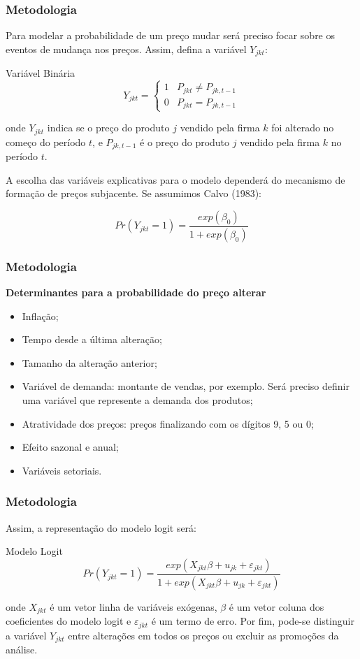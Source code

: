 \documentclass[aspectratio=169]{beamer}
\begin{document}
\begin{frame}\frametitle{Metodologia}
Para modelar a probabilidade de um preço mudar será preciso focar sobre os eventos de mudança nos preços. Assim, defina a variável $Y_{jkt}$:
  \begin{exampleblock}{Variável Binária}
  \[
Y_{jkt} =\begin{cases}1 &  P_{jkt} \neq P_{jk,t-1}\\0 & P_{jkt} = P_{jk,t-1}\end{cases}
  \]
  \end{exampleblock}
onde ${Y}_{jkt}$ indica se o preço do produto $j$ vendido pela firma $k$ foi alterado no começo do período $t$, e ${P}_{jk,t-1}$ é o preço do produto $j$ vendido pela firma $k$ no período $t$.

A escolha das variáveis explicativas para o modelo dependerá do mecanismo de formação de preços subjacente. Se assumimos Calvo (1983):

  \begin{equation}
  Pr({Y}_{jkt}=1)=\frac{exp({\beta}_{0})}{1+exp({\beta}_{0})} 
  \end{equation}
\end{frame}

\begin{frame}\frametitle{Metodologia}
  \textbf{Determinantes para a probabilidade do preço alterar}
  \begin{itemize}
  \item Inflação;
  \item Tempo desde a última alteração;
  \item Tamanho da alteração anterior;
  \item Variável de demanda: montante de vendas, por exemplo. Será preciso definir uma variável que represente a demanda dos produtos;
  \item Atratividade dos preços: preços finalizando com os dígitos 9, 5 ou 0;
  \item Efeito sazonal e anual;
  \item Variáveis setoriais.
  \end{itemize}
\end{frame}

\begin{frame}\frametitle{Metodologia}
Assim, a representação do modelo logit será:
  \begin{exampleblock}{Modelo Logit}
  \[
Pr\left( { Y }_{ jkt }=1 \right) =\frac { exp\left( { X }_{ jkt }\beta +{ u }_{ jk }+{ \varepsilon  }_{ jkt } \right)  }{ 1+exp\left( { X }_{ jkt }\beta +{ u }_{ jk }+{ \varepsilon  }_{ jkt } \right)  }
  \]
  \end{exampleblock}
onde ${ X }_{ jkt }$ é um vetor linha de variáveis exógenas, $\beta$ é um vetor coluna dos coeficientes do modelo logit e ${ \varepsilon  }_{ jkt }$ é um termo de erro. Por fim, pode-se distinguir a variável $Y_{jkt}$ entre alterações em todos os preços ou excluir as promoções da análise.
\end{frame}
\end{document}
